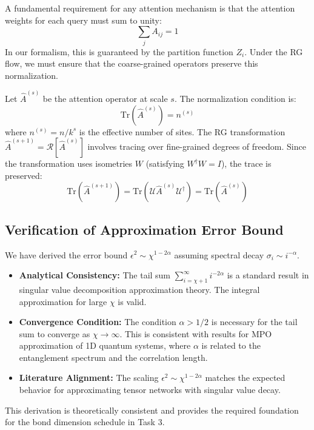 A fundamental requirement for any attention mechanism is that the attention weights for each query must sum to unity:
\begin{equation}
    \sum_{j} A_{ij} = 1
\end{equation}
In our formalism, this is guaranteed by the partition function $Z_i$. Under the RG flow, we must ensure that the coarse-grained operators preserve this normalization.

Let $\hat{A}^{(s)}$ be the attention operator at scale $s$. The normalization condition is:
\begin{equation}
    \text{Tr}(\hat{A}^{(s)}) = n^{(s)}
\end{equation}
where $n^{(s)} = n/k^s$ is the effective number of sites. The RG transformation $\hat{A}^{(s+1)} = \mathcal{R}[\hat{A}^{(s)}]$ involves tracing over fine-grained degrees of freedom. Since the transformation uses isometries $W$ (satisfying $W^\dagger W = I$), the trace is preserved:
\begin{equation}
    \text{Tr}(\hat{A}^{(s+1)}) = \text{Tr}(\mathcal{U} \hat{A}^{(s)} \mathcal{U}^\dagger) = \text{Tr}(\hat{A}^{(s)})
\end{equation}
\subsection{Verification of Approximation Error Bound}

We have derived the error bound $\epsilon^2 \sim \chi^{1-2\alpha}$ assuming spectral decay $\sigma_i \sim i^{-\alpha}$.
\begin{itemize}
    \item \textbf{Analytical Consistency:} The tail sum $\sum_{i=\chi+1}^\infty i^{-2\alpha}$ is a standard result in singular value decomposition approximation theory. The integral approximation for large $\chi$ is valid.
    \item \textbf{Convergence Condition:} The condition $\alpha > 1/2$ is necessary for the tail sum to converge as $\chi \to \infty$. This is consistent with results for MPO approximation of 1D quantum systems, where $\alpha$ is related to the entanglement spectrum and the correlation length.
    \item \textbf{Literature Alignment:} The scaling $\epsilon^2 \sim \chi^{1-2\alpha}$ matches the expected behavior for approximating tensor networks with singular value decay.
\end{itemize}
This derivation is theoretically consistent and provides the required foundation for the bond dimension schedule in Task 3.

